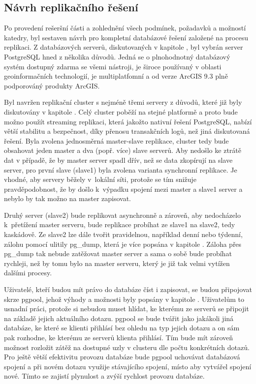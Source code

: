       \subsection{Návrh replikačního řešení}
      \label{kNavrh}

Po provedení rešeršní části a zohlednění všech podmínek, požadavků a možností katedry, byl sestaven návrh pro kompletní databázové řešení založené na procesu replikaci. Z databázových serverů, diskutovaných v kapitole , byl vybrán server PostgreSQL hned z několika důvodů. Jedná se o plnohodnotný databázový systém dostupný zdarma se všemi nástroji, je široce používaný v oblasti geoinformačních technologií, je multiplatfomní a od verze ArcGIS 9.3 plně podporováný produkty ArcGIS. 

Byl navržen replikační cluster s nejméně třemi servery z důvodů, které již byly diskutovány v kapitole . Celý cluster poběží na stejné platformě a proto bude možno použít streaming replikaci, která jakožto nativní řešení PostgreSQL, nabízí větší stabilitu a bezpečnost, díky přenosu transakčních logů, než jiná diskutovaná řešení. Byla zvolena jednosměrná master-slave replikace, cluster tedy bude obsahovat jeden master a dva (popř. více) slave serverů. Aby nedošlo ke ztrátě dat v případě, že by master server spadl dřív, než se data zkopírují na slave server, pro první slave (slave1) byla zvolena varianta synchronní replikace. Je vhodné, aby servery běžely v~lokální síti, protože se tím snižuje pravděpodobnost, že by došlo  k~výpadku spojení mezi master a slave1 server a nebylo by tak možno na master zapisovat. 

Druhý server (slave2) bude replikovat asynchronně a zároveň, aby nedocházelo k~přetížení master serveru, bude replikace probíhat ze slave1 na slave2, tedy kaskádově. Ze slave2 lze dále tvořit pravidelnou, například denní nebo týdenní, zálohu pomocí ulitily pg\_dump, která je více popsána v kapitole . Záloha přes pg\_dump tak nebude zatěžovat master server a sama o sobě bude probíhat rychleji, než by tomu bylo na master serveru, který je již tak velmi vytížen dalšími procesy.

Uživatelé, kteří budou mít právo do databáze číst i zapisovat, se budou připojovat skrze pgpool, jehož výhody a možnosti byly popsány v kapitole . Uživatelům to usnadní práci, protože si nebudou muset hlídat, ke kterému ze serverů se připojit na základě jejich aktuálního dotazu. pgpool se bude tvářit jako jakákoli jiná databáze, ke které se klienti přihlásí bez ohledu na typ jejich dotazu a on sám pak rozhodne, ke kterému ze serverů klienta přihlásí. Tím bude mít zároveň možnost rozložit zátěž na dostupné uzly v clusteru dle počtu konkrétních dotazů. Pro ještě větší efektivitu provozu databáze bude pgpool uchovávat databázová spojení a při novém dotazu využije stávajícího spojení, místo aby vytvářel spojení nové. Tímto se zajistí plynulost a zvýší rychlost provozu databáze.

